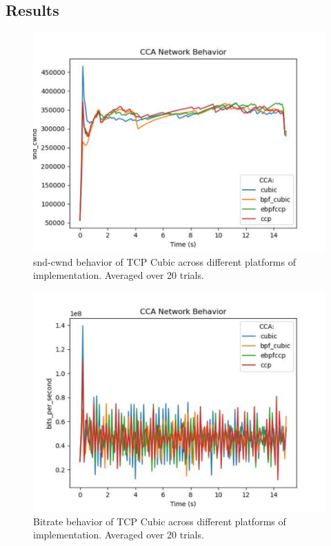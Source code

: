 \documentclass[../main.tex]{subfiles}
\begin{document}
\subsection{Results}

\begin{figure}[t]
    \centering
        \includegraphics[width=\columnwidth]{img/cca-behavior-cwnd}
        \caption{snd-cwnd behavior of TCP Cubic across different platforms of implementation. Averaged over 20 trials.
        }\label{fig:cca-behavior-cwnd}
    \end{figure}

\begin{figure}[t]
    \centering
        \includegraphics[width=\columnwidth]{img/cca-behavior-bitrate}
        \caption{Bitrate behavior of TCP Cubic across different platforms of implementation. Averaged over 20 trials.
        }\label{fig:cca-behavior-bitrate}
    \end{figure}
\end{document}
